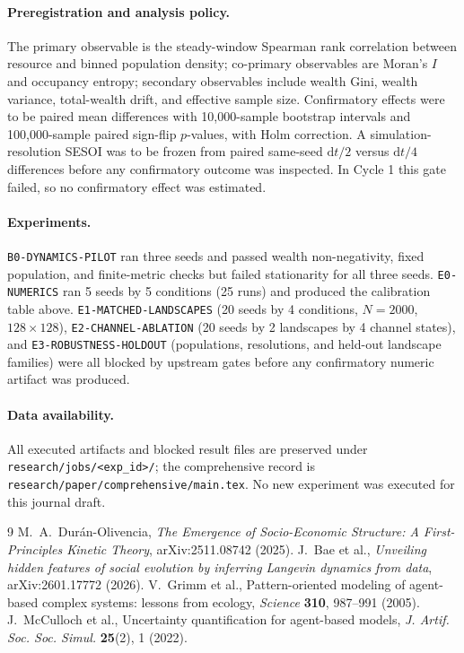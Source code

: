 \documentclass[11pt]{article}
\newcommand{\code}[1]{\texttt{#1}}
\begin{document}
\paragraph{Preregistration and analysis policy.} The primary observable is the
steady-window Spearman rank correlation between resource and binned population
density; co-primary observables are Moran's $I$ and occupancy entropy;
secondary observables include wealth Gini, wealth variance, total-wealth drift,
and effective sample size. Confirmatory effects were to be paired mean
differences with 10,000-sample bootstrap intervals and 100,000-sample paired
sign-flip $p$-values, with Holm correction. A simulation-resolution SESOI was
to be frozen from paired same-seed $\mathrm{d}t/2$ versus $\mathrm{d}t/4$
differences before any confirmatory outcome was inspected. In Cycle 1 this
gate failed, so no confirmatory effect was estimated.

\paragraph{Experiments.} \code{B0-DYNAMICS-PILOT} ran three seeds and passed
wealth non-negativity, fixed population, and finite-metric checks but failed
stationarity for all three seeds. \code{E0-NUMERICS} ran 5 seeds by 5
conditions (25 runs) and produced the calibration table above.
\code{E1-MATCHED-LANDSCAPES} (20 seeds by 4 conditions, $N=2000$,
$128\times128$), \code{E2-CHANNEL-ABLATION} (20 seeds by 2 landscapes by 4
channel states), and \code{E3-ROBUSTNESS-HOLDOUT} (populations, resolutions,
and held-out landscape families) were all blocked by upstream gates before any
confirmatory numeric artifact was produced.

\paragraph{Data availability.} All executed artifacts and blocked result files
are preserved under \code{research/jobs/<exp\_id>/}; the comprehensive record is
\code{research/paper/comprehensive/main.tex}. No new experiment was executed for
this journal draft.

\begin{thebibliography}{9}
M.~A.~Dur\'an-Olivencia, \emph{The Emergence of Socio-Economic Structure: A
First-Principles Kinetic Theory}, arXiv:2511.08742 (2025).
J.~Bae et al., \emph{Unveiling hidden features of social evolution by inferring
Langevin dynamics from data}, arXiv:2601.17772 (2026).
V.~Grimm et al., Pattern-oriented modeling of agent-based complex systems:
lessons from ecology, \emph{Science} \textbf{310}, 987--991 (2005).
J.~McCulloch et al., Uncertainty quantification for agent-based models,
\emph{J. Artif. Soc. Soc. Simul.} \textbf{25}(2), 1 (2022).
\end{thebibliography}
\end{document}
